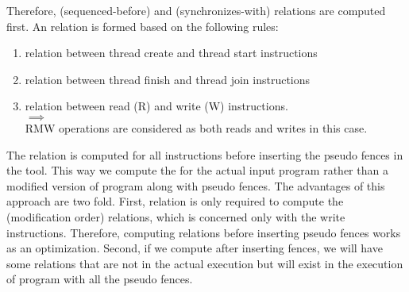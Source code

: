 \par
Therefore, \setSB (sequenced-before) and \setSW (synchronizes-with) 
relations are computed first. 
An \setSW relation is formed based on the following rules:
\begin{enumerate}
\item \setSW relation between thread create and thread start instructions\\

\item \setSW relation between thread finish and thread join instructions\\

\item \setSW relation between read (R) and write (W) instructions.\\
 $\implies$ \\
RMW operations are considered as both reads and writes in this case.
\end{enumerate}

\par


%	

\par
The \setHB relation is computed for all instructions before inserting the 
pseudo fences in the tool. 
This way we compute the \setHB for the actual input program rather than a 
modified version of program along with pseudo fences. The advantages of this
approach are two fold. First, \setHB relation is only required 
to compute the \setMO (modification order) relations, which is concerned only 
with the write instructions. Therefore, computing \setHB relations before 
inserting pseudo fences works as an optimization. Second, if we compute \setHB
after inserting fences, we will have some \setHB relations that are not in 
the actual execution but will exist in the execution of program with all the 
pseudo fences. 

